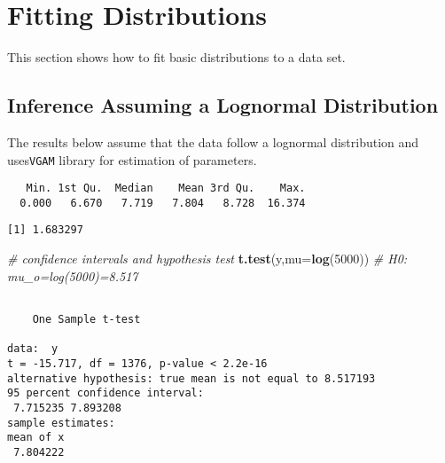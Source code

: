 \documentclass[]{book}
\newenvironment{Shaded}{\begin{snugshade}}{\end{snugshade}}
\newcommand{\KeywordTok}[1]{\textcolor[rgb]{0.13,0.29,0.53}{\textbf{#1}}}
\newcommand{\DataTypeTok}[1]{\textcolor[rgb]{0.13,0.29,0.53}{#1}}
\newcommand{\DecValTok}[1]{\textcolor[rgb]{0.00,0.00,0.81}{#1}}
\newcommand{\StringTok}[1]{\textcolor[rgb]{0.31,0.60,0.02}{#1}}
\newcommand{\CommentTok}[1]{\textcolor[rgb]{0.56,0.35,0.01}{\textit{#1}}}
\newcommand{\OperatorTok}[1]{\textcolor[rgb]{0.81,0.36,0.00}{\textbf{#1}}}
\newcommand{\NormalTok}[1]{#1}
\theoremstyle{definition}
\theoremstyle{definition}
\theoremstyle{definition}
\theoremstyle{remark}
\begin{document}
\section{Fitting Distributions}\label{fitting-distributions}

This section shows how to fit basic distributions to a data set.

\subsection{Inference Assuming a Lognormal
Distribution}\label{inference-assuming-a-lognormal-distribution}

The results below assume that the data follow a lognormal distribution
and uses\texttt{VGAM} library for estimation of parameters.

\begin{Shaded}
\end{Shaded}

\begin{verbatim}
   Min. 1st Qu.  Median    Mean 3rd Qu.    Max. 
  0.000   6.670   7.719   7.804   8.728  16.374 
\end{verbatim}

\begin{verbatim}
[1] 1.683297
\end{verbatim}

\begin{Shaded}
\begin{Highlighting}[]
\CommentTok{# confidence intervals and hypothesis test}
\KeywordTok{t.test}\NormalTok{(y,}\DataTypeTok{mu=}\KeywordTok{log}\NormalTok{(}\DecValTok{5000}\NormalTok{))   }\CommentTok{# H0: mu_o=log(5000)=8.517}
\end{Highlighting}
\end{Shaded}

\begin{verbatim}

    One Sample t-test

data:  y
t = -15.717, df = 1376, p-value < 2.2e-16
alternative hypothesis: true mean is not equal to 8.517193
95 percent confidence interval:
 7.715235 7.893208
sample estimates:
mean of x 
 7.804222 
\end{verbatim}
\end{document}
